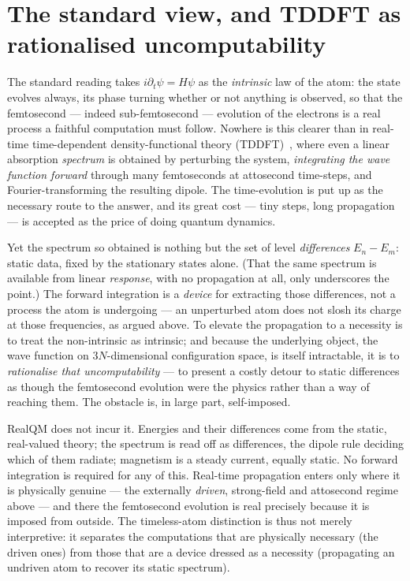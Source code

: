 \documentclass[11pt]{article}
\begin{document}
\section{The standard view, and TDDFT as rationalised uncomputability}

The standard reading takes $i\partial_t\psi=H\psi$ as the \emph{intrinsic} law of the atom: the state evolves
always, its phase turning whether or not anything is observed, so that the femtosecond --- indeed
sub-femtosecond --- evolution of the electrons is a real process a faithful computation must follow. Nowhere
is this clearer than in real-time time-dependent density-functional theory
(TDDFT)~\cite{RungeGross84,YabanaBertsch96}, where even a linear absorption \emph{spectrum} is obtained by
perturbing the system, \emph{integrating the wave function forward} through many femtoseconds at attosecond
time-steps, and Fourier-transforming the resulting dipole. The
time-evolution is put up as the necessary route to the answer, and its great cost --- tiny steps, long
propagation --- is accepted as the price of doing quantum dynamics.

Yet the spectrum so obtained is nothing but the set of level \emph{differences} $E_n-E_m$: static data, fixed
by the stationary states alone. (That the same spectrum is available from linear \emph{response}, with no
propagation at all, only underscores the point.) The forward integration is a \emph{device} for extracting
those differences, not a process the atom is undergoing --- an unperturbed atom does not slosh its charge at
those frequencies, as argued above. To elevate the propagation to a necessity is to treat the non-intrinsic
as intrinsic; and because the underlying object, the wave function on $3N$-dimensional configuration space, is
itself intractable, it is to \emph{rationalise that uncomputability} --- to present a costly detour to static
differences as though the femtosecond evolution were the physics rather than a way of reaching them. The
obstacle is, in large part, self-imposed.

RealQM does not incur it. Energies and their differences come from the static, real-valued theory; the
spectrum is read off as differences, the dipole rule deciding which of them radiate; magnetism is a steady
current, equally static. No forward integration is required for any of this. Real-time propagation enters
only where it is physically genuine --- the externally \emph{driven}, strong-field and attosecond regime
above --- and there the femtosecond evolution is real precisely because it is imposed from outside. The
timeless-atom distinction is thus not merely interpretive: it separates the computations that are physically
necessary (the driven ones) from those that are a device dressed as a necessity (propagating an undriven atom
to recover its static spectrum).
\end{document}

